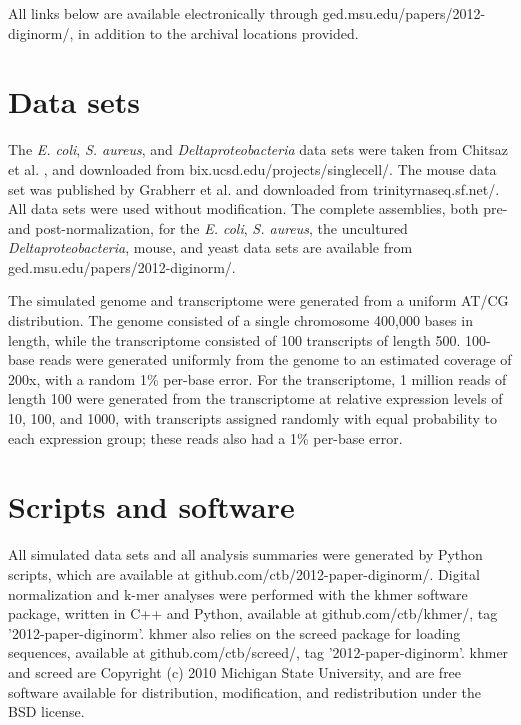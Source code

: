 \documentclass{pnastwo}
\begin{document}
\begin{article}

\begin{materials}

All links below are available electronically through
ged.msu.edu/papers/2012-diginorm/, in addition to the
archival locations provided.

\section{Data sets}

The {\em E. coli}, {\em S. aureus}, and {\em Deltaproteobacteria} data
sets were taken from Chitsaz et al. \cite{pubmed21926975}, and
downloaded from bix.ucsd.edu/projects/singlecell/.  The
mouse data set was published by Grabherr et al. \cite{pubmed21572440}
and downloaded from trinityrnaseq.sf.net/.  All data sets
were used without modification.
The complete assemblies, both pre- and post-normalization, for the
{\em E. coli}, {\em S. aureus}, the uncultured {\em
  Deltaproteobacteria}, mouse, and yeast data sets are available from
ged.msu.edu/papers/2012-diginorm/.

The simulated genome and transcriptome were generated from a uniform
AT/CG distribution.  The genome consisted of a single chromosome
400,000 bases in length, while the transcriptome consisted of 100
transcripts of length 500.  100-base reads were generated uniformly
from the genome to an estimated coverage of 200x, with a random 1\%
per-base error.  For the transcriptome, 1 million reads of length 100
were generated from the transcriptome at relative expression levels of
10, 100, and 1000, with transcripts assigned randomly with equal
probability to each expression group; these reads also had a 1\%
per-base error.

\section{Scripts and software}

All simulated data sets and all analysis summaries were generated by
Python scripts, which are available at
github.com/ctb/2012-paper-diginorm/.  Digital normalization and k-mer
analyses were performed with the khmer software package, written in
C++ and Python, available at github.com/ctb/khmer/, tag
'2012-paper-diginorm'.  khmer also relies on the screed package for
loading sequences, available at github.com/ctb/screed/, tag
'2012-paper-diginorm'.  khmer and screed are Copyright (c) 2010
Michigan State University, and are free software available for
distribution, modification, and redistribution under the BSD license.


\end{materials}
\end{article}
\end{document}
